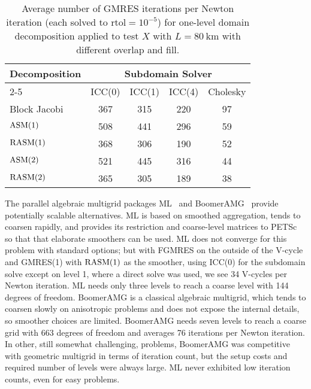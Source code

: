 \begin{table}
  \centering\caption{Average number of GMRES iterations per Newton iteration (each solved to $\mathrm{rtol}=10^{-5}$) for one-level domain decomposition applied to test $X$ with $L=\SI{80}{\kilo\metre}$ with different overlap and fill.}\label{tab:1level}
  \begin{tabular}{lcccc}
    \toprule
    \multirow{3}{*}{Decomposition} & \multicolumn{4}{c}{Subdomain Solver} \\
    \cmidrule{2-5}
     & ICC(0) & ICC(1) & ICC(4) & Cholesky \\
    \midrule
    Block Jacobi & 367 & 315 & 220 & 97 \\
    $\mathrm{ASM}(1)$     & 508 & 441 & 296 & 59 \\
    $\mathrm{RASM}(1)$    & 368 & 306 & 190 & 52 \\
    $\mathrm{ASM}(2)$     & 521 & 445 & 316 & 44 \\
    $\mathrm{RASM}(2)$    & 365 & 305 & 189 & 38 \\
    \bottomrule
  \end{tabular}
\end{table}

The parallel algebraic multigrid packages ML~\citep{ml-guide} and BoomerAMG~\citep{henson2002bpa} provide potentially scalable alternatives.  ML is based on smoothed aggregation, tends to coarsen rapidly, and provides its restriction and coarse-level matrices to PETSc so that that elaborate smoothers can be used.  ML does not converge for this problem with standard options; but with FGMRES on the outside of the V-cycle and GMRES(1) with $\mathrm{RASM}(1)$ as the smoother, using ICC(0) for the subdomain solve except on level 1, where a direct solve was used, we see 34 V-cycles per Newton iteration.  ML needs only three levels to reach a coarse level with 144 degrees of freedom.  BoomerAMG is a classical algebraic multigrid, which tends to coarsen slowly on anisotropic problems and does not expose the internal details, so smoother choices are limited.  BoomerAMG needs seven levels to reach a coarse grid with 663 degrees of freedom and averages 76 iterations per Newton iteration.
In other, still somewhat challenging, problems, BoomerAMG was competitive with geometric multigrid in terms of iteration count, but the setup costs and required number of levels were always large.
ML never exhibited low iteration counts, even for easy problems.

